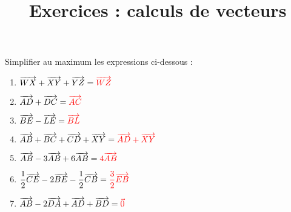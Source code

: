 \documentclass[
	classe=$2^{de}$,
	headerTitle={Exercices}
]{exercice}
\title{Exercices : calculs de vecteurs}
\begin{document}
\maketitle

\begin{exercice}
	Simplifier au maximum les expressions ci-dessous :
	\newcommand{\correctionSpace}{4em}
	\begin{enumerate}
		\item $\widevec{WX} + \widevec{XY} + \widevec{YZ} = \correction{\widevec{WZ}}$
		      \vspace{\correctionSpace}
		\item $\widevec{AD} + \widevec{DC} = \correction{\widevec{AC}}$
		      \vspace{\correctionSpace}
		\item $\widevec{BE} - \widevec{LE} = \correction{\widevec{BL}}$

		      \vspace{\correctionSpace}
		\item $\widevec{AB} + \widevec{BC} + \widevec{CD} + \widevec{XY} = \correction{\widevec{AD} + \widevec{XY}}$

		      \vspace{\correctionSpace}
		\item $\widevec{AB} - 3\widevec{AB} + 6\widevec{AB} = \correction{4\widevec{AB}}$

		      \vspace{\correctionSpace}
		\item $\dfrac{1}{2}\widevec{CE} - 2\widevec{BE} - \dfrac{1}{2}\widevec{CB} = \correction{\dfrac{3}{2}\widevec{EB}}$

		      \vspace{\correctionSpace}
		\item $\widevec{AB} - 2\widevec{DA} + \widevec{AD} + \widevec{BD} = \correction{\vec{0}}$

		      \vspace{\correctionSpace}
	\end{enumerate}
\end{exercice}
\end{document}

